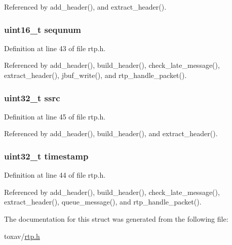Referenced by add\+\_\+header(), and extract\+\_\+header().

\hypertarget{struct___r_t_p_header_afe208c7dec97b8f61e08094e61bf096e}{
\subsubsection[{sequnum}]{\setlength{\rightskip}{0pt plus 5cm}uint16\+\_\+t sequnum}}\label{struct___r_t_p_header_afe208c7dec97b8f61e08094e61bf096e}


Definition at line 43 of file rtp.\+h.



Referenced by add\+\_\+header(), build\+\_\+header(), check\+\_\+late\+\_\+message(), extract\+\_\+header(), jbuf\+\_\+write(), and rtp\+\_\+handle\+\_\+packet().

\hypertarget{struct___r_t_p_header_a7728cdfcf33cc14c0d7ba2dcdcbcdf2e}{
\subsubsection[{ssrc}]{\setlength{\rightskip}{0pt plus 5cm}uint32\+\_\+t ssrc}}\label{struct___r_t_p_header_a7728cdfcf33cc14c0d7ba2dcdcbcdf2e}


Definition at line 45 of file rtp.\+h.



Referenced by add\+\_\+header(), build\+\_\+header(), and extract\+\_\+header().

\hypertarget{struct___r_t_p_header_ab20b0c7772544cf5d318507f34231fbe}{
\subsubsection[{timestamp}]{\setlength{\rightskip}{0pt plus 5cm}uint32\+\_\+t timestamp}}\label{struct___r_t_p_header_ab20b0c7772544cf5d318507f34231fbe}


Definition at line 44 of file rtp.\+h.



Referenced by add\+\_\+header(), build\+\_\+header(), check\+\_\+late\+\_\+message(), extract\+\_\+header(), queue\+\_\+message(), and rtp\+\_\+handle\+\_\+packet().



The documentation for this struct was generated from the following file\+:\begin{DoxyCompactItemize}
\item 
toxav/\hyperlink{rtp_8h}{rtp.\+h}\end{DoxyCompactItemize}

